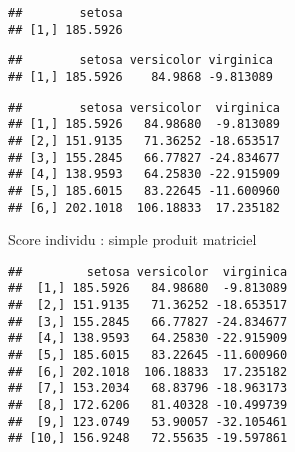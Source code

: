 \documentclass[
]{article}
\newenvironment{Shaded}{\begin{snugshade}}{\end{snugshade}}
\newcommand{\DecValTok}[1]{\textcolor[rgb]{0.00,0.00,0.81}{#1}}
\newcommand{\KeywordTok}[1]{\textcolor[rgb]{0.13,0.29,0.53}{\textbf{#1}}}
\newcommand{\NormalTok}[1]{#1}
\newcommand{\OperatorTok}[1]{\textcolor[rgb]{0.81,0.36,0.00}{\textbf{#1}}}
\newcommand{\StringTok}[1]{\textcolor[rgb]{0.31,0.60,0.02}{#1}}
\begin{document}
\begin{verbatim}
##        setosa
## [1,] 185.5926
\end{verbatim}

\begin{Shaded}
\end{Shaded}

\begin{verbatim}
##        setosa versicolor virginica
## [1,] 185.5926    84.9868 -9.813089
\end{verbatim}

\begin{Shaded}
\end{Shaded}

\begin{verbatim}
##        setosa versicolor  virginica
## [1,] 185.5926   84.98680  -9.813089
## [2,] 151.9135   71.36252 -18.653517
## [3,] 155.2845   66.77827 -24.834677
## [4,] 138.9593   64.25830 -22.915909
## [5,] 185.6015   83.22645 -11.600960
## [6,] 202.1018  106.18833  17.235182
\end{verbatim}

Score individu : simple produit matriciel

\begin{Shaded}
\end{Shaded}

\begin{verbatim}
##         setosa versicolor  virginica
##  [1,] 185.5926   84.98680  -9.813089
##  [2,] 151.9135   71.36252 -18.653517
##  [3,] 155.2845   66.77827 -24.834677
##  [4,] 138.9593   64.25830 -22.915909
##  [5,] 185.6015   83.22645 -11.600960
##  [6,] 202.1018  106.18833  17.235182
##  [7,] 153.2034   68.83796 -18.963173
##  [8,] 172.6206   81.40328 -10.499739
##  [9,] 123.0749   53.90057 -32.105461
## [10,] 156.9248   72.55635 -19.597861
\end{verbatim}
\end{document}
